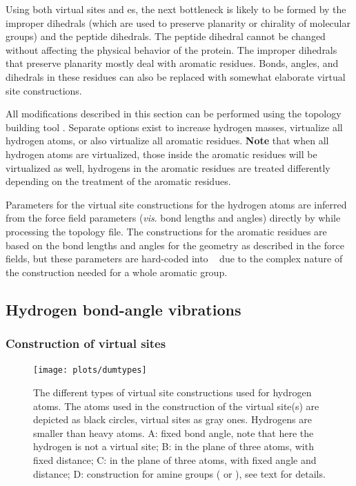 Using both virtual sites and es, the next
bottleneck is likely to be formed by the improper dihedrals (which are
used to preserve planarity or chirality of molecular groups) and the
peptide dihedrals. The peptide dihedral cannot be changed without
affecting the physical behavior of the protein. The improper dihedrals
that preserve planarity mostly deal with aromatic residues. Bonds,
angles, and dihedrals in these residues can also be replaced with
somewhat elaborate virtual site constructions.

All modifications described in this section can be performed using the
{\gromacs} topology building tool {\tt {}}. Separate
options exist to increase hydrogen masses, virtualize all hydrogen atoms,
or also virtualize all aromatic residues. {\bf Note} that when all hydrogen
atoms are virtualized, those inside the aromatic residues will be
virtualized as well, {\ie} hydrogens in the aromatic residues are treated
differently depending on the treatment of the aromatic residues.

Parameters for the virtual site constructions for the hydrogen atoms are
inferred from the force field parameters ({\em vis}. bond lengths and
angles) directly by {\tt {}} while processing the
topology file.  The constructions for the aromatic residues are based
on the bond lengths and angles for the geometry as described in the
force fields, but these parameters are hard-coded into {\tt
{}} due to the complex nature of the construction
needed for a whole aromatic group.

\subsection{Hydrogen bond-angle vibrations}
\label{sec:vsitehydro}
\subsubsection{Construction of virtual sites} %
\begin{figure}
\centerline{\texttt{[image: plots/dumtypes]}}
\caption[Virtual site constructions for hydrogen atoms.]{The different
types of virtual site constructions used for hydrogen atoms. The atoms
used in the construction of the virtual site(s) are depicted as black
circles, virtual sites as gray ones. Hydrogens are smaller than heavy
atoms. {\sf A}: fixed bond angle, note that here the hydrogen is not a
virtual site; {\sf B}: in the plane of three atoms, with fixed distance;
{\sf C}: in the plane of three atoms, with fixed angle and distance;
{\sf D}: construction for amine groups ({\amine} or {\aminep}), see
text for details.}
\label{fig:vsitehydro}
\end{figure}

